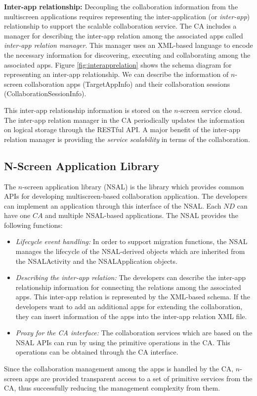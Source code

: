 \documentclass{sig-alternate}
\newcommand{\bi}{\begin{itemize}}
\newcommand{\ei}{\end{itemize}}
\newcommand{\ii}{\item}
\begin{document}
\noindent
\textbf{Inter-app relationship:}
Decoupling the collaboration information from the multiscreen applications requires representing the inter-application (or \textit{inter-app}) relationship to support the scalable collaboration service. The CA includes a manager for describing the inter-app relation among the associated apps called \textit{inter-app relation manager}. This manager uses an XML-based language to encode the necessary information for discovering, executing and collaborating among the associated apps. 
Figure \ref{fig:interapprelation} shows the schema diagram for representing an inter-app relationship. We can describe the information of $n$-screen collaboration apps (TargetAppInfo) and their collaboration sessions (CollaborationSessionInfo).

This inter-app relationship information is stored on the $n$-screen service cloud. The inter-app relation manager in the CA periodically updates the information on logical storage through the RESTful API.
A major benefit of the inter-app relation manager is providing the \textit{service scalability} in terms of the collaboration.

\subsection{N-Screen Application Library}
The $n$-screen application library (NSAL) is the library which provides common APIs for developing multiscreen-based collaboration application. The developers can implement an application through this interface of the NSAL. Each $ND$ can have one $CA$ and multiple NSAL-based applications. The NSAL provides the following functions:
\bi
\ii \textit{Lifecycle event handling: } In order to support migration functions, the NSAL manages the lifecycle of the NSAL-derived objects which are inherited from the NSALActivity and the NSALApplication objects. 
\ii \textit{Describing the inter-app relation:} The developers can describe the inter-app relationship information for connecting the relations among the associated apps. This inter-app relation is represented by the XML-based schema. If the developers want to add an additional apps for extending the collaboration, they can insert information of the apps into the inter-app relation XML file.
\ii \textit{Proxy for the CA interface: } The collaboration services which are based on the NSAL APIs can run by using the primitive operations in the CA. This operations can be obtained through the CA interface. 
\ei 
Since the collaboration management among the apps is handled by the CA, 
$n$-screen apps are provided transparent access to a set of primitive services from the CA, thus successfully reducing the management complexity from them.
\end{document}

